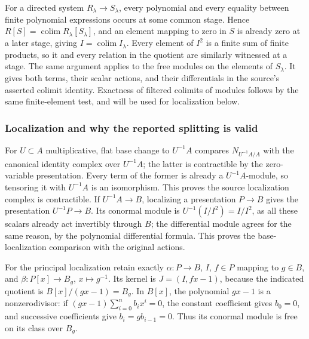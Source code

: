 For a directed system \(R_\lambda\to S_\lambda\), every polynomial and every equality between finite polynomial expressions occurs at some common stage. Hence \(R[S]=\operatorname{colim}R_\lambda[S_\lambda]\), and an element mapping to zero in \(S\) is already zero at a later stage, giving \(I=\operatorname{colim}I_\lambda\). Every element of \(I^2\) is a finite sum of finite products, so it and every relation in the quotient are similarly witnessed at a stage. The same argument applies to the free modules on the elements of \(S_\lambda\). It gives both terms, their scalar actions, and their differentials in the source's asserted colimit identity. Exactness of filtered colimits of modules follows by the same finite-element test, and will be used for localization below.

\subsubsection{Localization and why the reported splitting is valid}\label{algebra-proof-044-localization-and-why-the-reported-splitting-is-valid}

For \(U\subset A\) multiplicative, flat base change to \(U^{-1}A\) compares \(N_{U^{-1}A/A}\) with the canonical identity complex over \(U^{-1}A\); the latter is contractible by the zero-variable presentation. Every term of the former is already a \(U^{-1}A\)-module, so tensoring it with \(U^{-1}A\) is an isomorphism. This proves the source localization complex is contractible. If \(U^{-1}A\to B\), localizing a presentation \(P\to B\) gives the presentation \(U^{-1}P\to B\). Its conormal module is \(U^{-1}(I/I^2)=I/I^2\), as all these scalars already act invertibly through \(B\); the differential module agrees for the same reason, by the polynomial differential formula. This proves the base-localization comparison with the original actions.

For the principal localization retain exactly \(\alpha:P\to B\), \(I\), \(f\in P\) mapping to \(g\in B\), and \(\beta:P[x]\to B_g\), \(x\mapsto g^{-1}\). Its kernel is \(J=(I,fx-1)\), because the indicated quotient is \(B[x]/(gx-1)=B_g\). In \(B[x]\), the polynomial \(gx-1\) is a nonzerodivisor: if \((gx-1)\sum_{i=0}^n b_ix^i=0\), the constant coefficient gives \(b_0=0\), and successive coefficients give \(b_i=gb_{i-1}=0\). Thus its conormal module is free on its class over \(B_g\).

